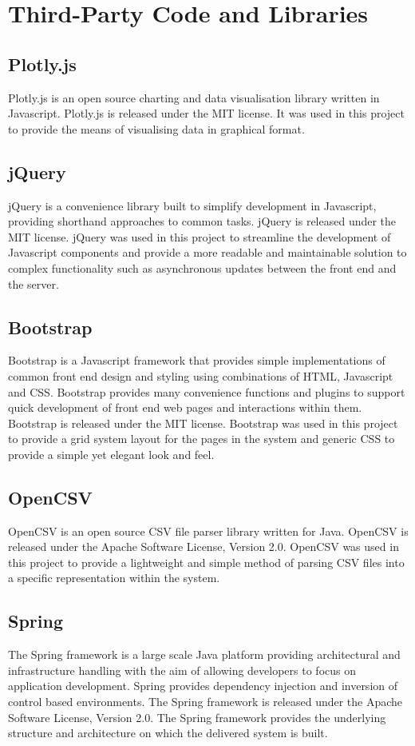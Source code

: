 \chapter{Third-Party Code and Libraries}

\section{Plotly.js}
Plotly.js is an open source charting and data visualisation library written in Javascript. Plotly.js is released under the MIT license. It was used in this project to provide the means of visualising data in graphical format.

\section{jQuery}
jQuery is a convenience library built to simplify development in Javascript, providing shorthand approaches to common tasks. jQuery is released under the MIT license. jQuery was used in this project to streamline the development of Javascript components and provide a more readable and maintainable solution to complex functionality such as asynchronous updates between the front end and the server.
\section{Bootstrap}
Bootstrap is a Javascript framework that provides simple implementations of common front end design and styling using combinations of HTML, Javascript and CSS. Bootstrap provides many convenience functions and plugins to support quick development of front end web pages and interactions within them. Bootstrap is released under the MIT license. Bootstrap was used in this project to provide a grid system layout for the pages in the system and generic CSS to provide a simple yet elegant look and feel. 
\section{OpenCSV}
OpenCSV is an open source CSV file parser library written for Java. OpenCSV is released under the Apache Software License, Version 2.0. OpenCSV was used in this project to provide a lightweight and simple method of parsing CSV files into a specific representation within the system.
\section{Spring}
The Spring framework is a large scale Java platform providing architectural and infrastructure handling with the aim of allowing developers to focus on application development. Spring provides dependency injection and inversion of control based environments. The Spring framework is released under the Apache Software License, Version 2.0. The Spring framework provides the underlying structure and architecture on which the delivered system is built.
